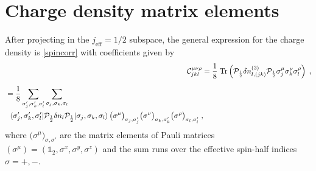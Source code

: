 \section{Charge density matrix elements}
After projecting in the $j_{\text{eff}}=1/2$ subspace, the general expression for the charge density is \eqref{spincorr} with coefficients given by
\begin{align}
    \mathcal{C}_{jkl}^{\mu\nu\rho} &=
    \frac{1}{8} \; \text{Tr} \left( \mathcal{P}_{\frac12}  \delta n_{l,(jk)}^{(3)} \mathcal{P}_{\frac12} \sigma^\mu_j \sigma^\nu_k \sigma^\rho_l  \right) \; , \\[6pt]
    \begin{split}
     &=
    \frac{1}{8} \sum_{\sigma_j',\sigma_k',\sigma_l'}\sum_{\sigma_j, \sigma_k, \sigma_l} \\
    & \;\,
    \braket{\sigma_j',\sigma_k',\sigma_l' | \mathcal{P}_{\frac12}  \delta n_l \mathcal{P}_{\frac12}  | \sigma_j, \sigma_k, \sigma_l}
    \big(\sigma^\mu\big)_{\sigma_j,\sigma_j'}
    \big(\sigma^\nu\big)_{\sigma_k,\sigma_k'}
    \big(\sigma^\rho\big)_{\sigma_l,\sigma_l'}
     \; , \!
    \end{split}
\end{align}
where $\big(\sigma^\mu\big)_{\sigma,\sigma'}$ are the matrix elements of Pauli matrices $(\sigma^\mu)=(\mathbb{1}_2,\sigma^x,\sigma^y,\sigma^z)$ and the sum runs over the effective spin-half indices $\sigma=+,-$.

